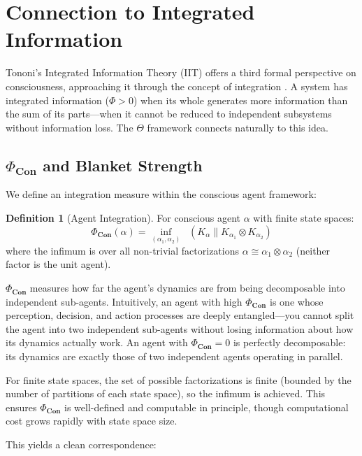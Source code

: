 \documentclass[11pt,a4paper]{article}
\theoremstyle{definition}
\newtheorem{definition}{Definition}[section]
\theoremstyle{plain}
\theoremstyle{remark}
\newcommand{\Con}{\mathbf{Con}}
\DeclareMathOperator{\DKL}{D_{KL}}
\begin{document}
\section{Connection to Integrated Information}\label{sec:iit}

Tononi's Integrated Information Theory (IIT) offers a third formal perspective on consciousness, approaching it through the concept of integration \citep{Tononi2015}. A system has integrated information ($\Phi > 0$) when its whole generates more information than the sum of its parts---when it cannot be reduced to independent subsystems without information loss. The $\Theta$ framework connects naturally to this idea.

\subsection{$\Phi_{\Con}$ and Blanket Strength}\label{sec:phi-con}

We define an integration measure within the conscious agent framework:

\begin{definition}[Agent Integration]
For conscious agent $\alpha$ with finite state spaces:
$$\Phi_{\Con}(\alpha) = \inf_{(\alpha_1, \alpha_2)} \DKL(K_\alpha \| K_{\alpha_1} \otimes K_{\alpha_2})$$
where the infimum is over all non-trivial factorizations $\alpha \cong \alpha_1 \otimes \alpha_2$ (neither factor is the unit agent).
\end{definition}

$\Phi_{\Con}$ measures how far the agent's dynamics are from being decomposable into independent sub-agents. Intuitively, an agent with high $\Phi_{\Con}$ is one whose perception, decision, and action processes are deeply entangled---you cannot split the agent into two independent sub-agents without losing information about how its dynamics actually work. An agent with $\Phi_{\Con} = 0$ is perfectly decomposable: its dynamics are exactly those of two independent agents operating in parallel.

For finite state spaces, the set of possible factorizations is finite (bounded by the number of partitions of each state space), so the infimum is achieved. This ensures $\Phi_{\Con}$ is well-defined and computable in principle, though computational cost grows rapidly with state space size.

This yields a clean correspondence:
\end{document}

